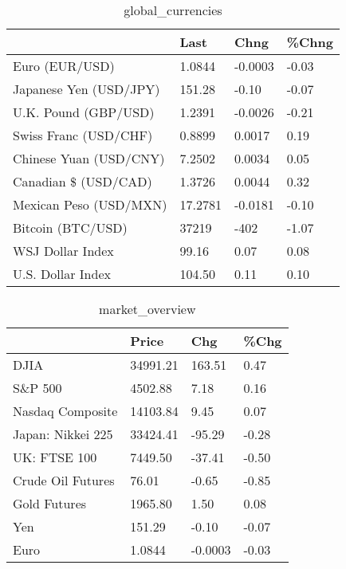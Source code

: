 \documentclass{article}%
\begin{document}
%


\begin{table}[htbp]%
\caption{global\_currencies}%
\centering%
\begin{adjustbox}{width=1\textwidth}%
\begin{tabular}{llll}
\toprule
                       &    Last &    Chng & \%Chng \\
\midrule
        Euro (EUR/USD) &  1.0844 & -0.0003 & -0.03 \\
Japanese Yen (USD/JPY) &  151.28 &   -0.10 & -0.07 \\
  U.K. Pound (GBP/USD) &  1.2391 & -0.0026 & -0.21 \\
 Swiss Franc (USD/CHF) &  0.8899 &  0.0017 &  0.19 \\
Chinese Yuan (USD/CNY) &  7.2502 &  0.0034 &  0.05 \\
  Canadian \$ (USD/CAD) &  1.3726 &  0.0044 &  0.32 \\
Mexican Peso (USD/MXN) & 17.2781 & -0.0181 & -0.10 \\
     Bitcoin (BTC/USD) &   37219 &    -402 & -1.07 \\
      WSJ Dollar Index &   99.16 &    0.07 &  0.08 \\
     U.S. Dollar Index &  104.50 &    0.11 &  0.10 \\
\bottomrule
\end{tabular}
%
\end{adjustbox}%
\end{table}

%


\begin{table}[htbp]%
\caption{market\_overview}%
\centering%
\begin{adjustbox}{width=1\textwidth}%
\begin{tabular}{llll}
\toprule
                  &    Price &     Chg &  \%Chg \\
\midrule
             DJIA & 34991.21 &  163.51 &  0.47 \\
          S\&P 500 &  4502.88 &    7.18 &  0.16 \\
 Nasdaq Composite & 14103.84 &    9.45 &  0.07 \\
Japan: Nikkei 225 & 33424.41 &  -95.29 & -0.28 \\
     UK: FTSE 100 &  7449.50 &  -37.41 & -0.50 \\
Crude Oil Futures &    76.01 &   -0.65 & -0.85 \\
     Gold Futures &  1965.80 &    1.50 &  0.08 \\
              Yen &   151.29 &   -0.10 & -0.07 \\
             Euro &   1.0844 & -0.0003 & -0.03 \\
\bottomrule
\end{tabular}
%
\end{adjustbox}%
\end{table}

%
\end{document}
